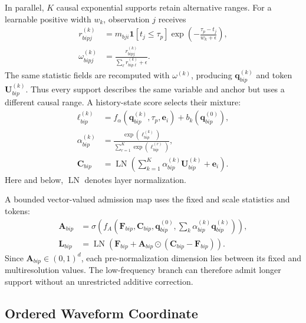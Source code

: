 In parallel, $K$ causal exponential supports retain alternative ranges. For a
learnable positive width $w_k$, observation $j$ receives
\begin{align}
r^{(k)}_{bipj} &=m_{bji}\mathbf 1[t_j\leq\tau_p]
\exp\!\left(-\frac{\tau_p-t_j}{w_k+\epsilon}\right), \label{eq:support-weight}\\
\omega^{(k)}_{bipj} &=
\frac{r^{(k)}_{bipj}}{\sum_{\ell}r^{(k)}_{bip\ell}+\epsilon}.
\label{eq:normalized-weight}
\end{align}
The same statistic fields are recomputed with $\omega^{(k)}$, producing
$\mathbf q^{(k)}_{bip}$ and token $\mathbf U^{(k)}_{bip}$. Thus every support
describes the same variable and anchor but uses a different causal range. A
history-state score selects their mixture:
\begin{align}
\ell^{(k)}_{bip} &= f_\alpha(\mathbf q^{(k)}_{bip},\tau_p,\mathbf e_i)
+ b_k(\mathbf q^{(0)}_{bip}), \label{eq:scale-logit}\\
\alpha^{(k)}_{bip} &=
\frac{\exp(\ell^{(k)}_{bip})}{\sum_{r=1}^{K}\exp(\ell^{(r)}_{bip})},
\label{eq:scale-softmax}\\
\mathbf C_{bip} &= \operatorname{LN}\!\left(
\sum_{k=1}^{K}\alpha^{(k)}_{bip}\mathbf U^{(k)}_{bip}+\mathbf e_i\right).
\label{eq:scale-token}
\end{align}
Here and below, $\operatorname{LN}$ denotes layer normalization.

A bounded vector-valued admission map uses the fixed and scale statistics and tokens:
\begin{align}
\mathbf A_{bip} &= \sigma\!\left(f_A(\mathbf F_{bip},\mathbf C_{bip},
\mathbf q^{(0)}_{bip},\textstyle\sum_k\alpha^{(k)}_{bip}\mathbf q^{(k)}_{bip})
\right), \label{eq:admission}\\
\mathbf L_{bip} &= \operatorname{LN}\!\left(
\mathbf F_{bip}+\mathbf A_{bip}\odot(\mathbf C_{bip}-\mathbf F_{bip})\right).
\label{eq:level-token}
\end{align}
Since $\mathbf A_{bip}\in(0,1)^d$, each pre-normalization dimension lies
between its fixed and multiresolution values. The low-frequency branch can
therefore admit longer support without an unrestricted additive correction.

\subsection{Ordered Waveform Coordinate}

